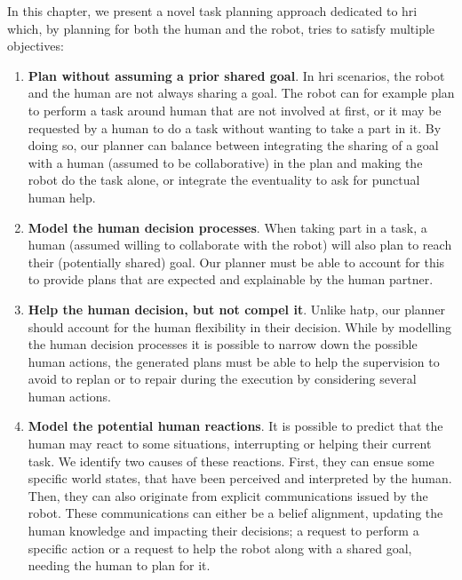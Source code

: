 \documentclass[a4paper,11pt,twoside]{StyleThese}
\begin{document}
\smallskip

In this chapter, we present a novel task planning approach dedicated to \acrshort{hri} which, by planning for both the human and the robot, tries to satisfy multiple objectives:

\begin{enumerate}
\item \textbf{Plan without assuming a prior shared goal}. In \acrshort{hri} scenarios, the robot and the human are not always sharing a goal. The robot can for example plan to perform a task around human that are not involved at first, or it may be requested by a human to do a task without wanting to take a part in it. By doing so, our planner can balance between integrating the sharing of a goal with a human (assumed to be collaborative) in the plan and making the robot do the task alone, or integrate the eventuality to ask for punctual human help.

\item \textbf{Model the human decision processes}. When taking part in a task, a human (assumed willing to collaborate with the robot) will also plan to reach their (potentially shared) goal. Our planner must be able to account for this to provide plans that are expected and explainable by the human partner.

\item \textbf{Help the human decision, but not compel it}. Unlike \acrshort{hatp}, our planner should account for the human flexibility in their decision. While by modelling the human decision processes it is possible to narrow down the possible human actions, the generated plans must be able to help the supervision to avoid to replan or to repair during the execution by considering several human actions.

\item \textbf{Model the potential human reactions}. It is possible to predict that the human may react to some situations, interrupting or helping their current task. We identify two causes of these reactions. First, they can ensue some specific world states, that have been perceived and interpreted by the human. Then, they can also originate from explicit communications issued by the robot. These communications can either be a belief alignment, updating the human knowledge and impacting their decisions; a request to perform a specific action or a request to help the robot along with a shared goal, needing the human to plan for it.


\end{enumerate}
\end{document}
